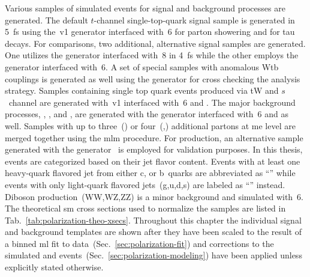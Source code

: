 Various samples of simulated events for signal and background processes are generated. The default $t$-channel single-top-quark signal sample is generated in 5~\gls{fs} using the \POWHEG\,v1 generator interfaced with \PYTHIA\,6 for parton showering and \TAUOLA for tau decays. For comparisons, two additional, alternative signal samples are generated. One utilizes the \AMC generator interfaced with \PYTHIA\,8 in 4~\gls{fs} while the other employs the \COMPHEP generator interfaced with \PYTHIA\,6. A set of special samples with anomalous Wtb couplings is generated as well using the \COMPHEP generator for cross checking the analysis strategy. Samples containing single top quark events produced via tW and $s$~channel are generated with \POWHEG\,v1 interfaced with \PYTHIA\,6 and \TAUOLA. The major background processes, \wjets, \zjets, and \ttbar, are generated with the \MG generator interfaced with \PYTHIA\,6 and \TAUOLA as well. Samples with up to three~(\ttbar) or four~(\wjets,\zjets) additional partons at \gls{me} level are merged together using the \gls{mlm} procedure. For \wjets production, an alternative sample generated with the \SHERPA generator~\cite{Hoeche:2012ft} is employed for validation purposes. In this thesis, \wjets events are categorized based on their jet flavor content. Events with at least one heavy-quark flavored jet from either c, or b~quarks are abbreviated as ``'' while events with only light-quark flavored jets~(g,u,d,s) are labeled as ``'' instead. Diboson production~(WW,WZ,ZZ) is a minor background and simulated with \PYTHIA\,6. The theoretical \gls{sm} cross sections used to normalize the samples are listed in Tab.~\ref{tab:polarization-theo-xsecs}. Throughout this chapter the individual signal and background templates are shown after they have been scaled to the result of a binned \gls{ml} fit to data~(Sec.~\ref{sec:polarization-fit}) and corrections to the simulated \wjets and \ttbar events~(Sec.~\ref{sec:polarization-modeling}) have been applied unless explicitly stated otherwise.


